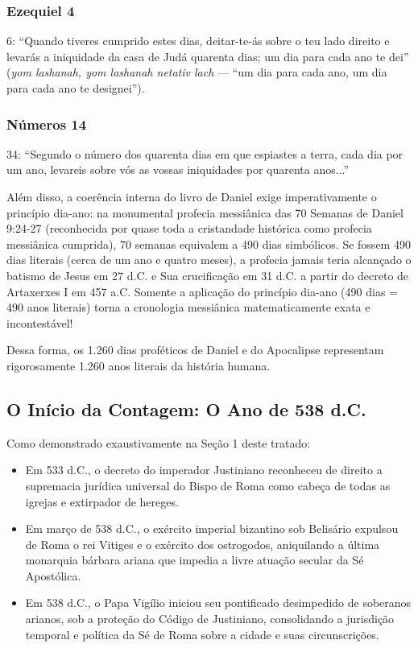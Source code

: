 \documentclass[11pt,a4paper,openany]{book}
\begin{document}
\subsubsection*{Ezequiel 4}
6: ``Quando tiveres cumprido estes dias, deitar-te-ás sobre o teu lado direito e levarás a iniquidade da casa de Judá quarenta dias; um dia para cada ano te dei'' (\textit{yom lashanah, yom lashanah netativ lach} — ``um dia para cada ano, um dia para cada ano te designei'').

\subsubsection*{Números 14}
34: ``Segundo o número dos quarenta dias em que espiastes a terra, cada dia por um ano, levareis sobre vós as vossas iniquidades por quarenta anos...''

Além disso, a coerência interna do livro de Daniel exige imperativamente o princípio dia-ano: na monumental profecia messiânica das 70 Semanas de Daniel 9:24-27 (reconhecida por quase toda a cristandade histórica como profecia messiânica cumprida), 70 semanas equivalem a 490 dias simbólicos. Se fossem 490 dias literais (cerca de um ano e quatro meses), a profecia jamais teria alcançado o batismo de Jesus em 27 d.C. e Sua crucificação em 31 d.C. a partir do decreto de Artaxerxes I em 457 a.C. Somente a aplicação do princípio dia-ano (490 dias = 490 anos literais) torna a cronologia messiânica matematicamente exata e incontestável!

Dessa forma, os 1.260 dias proféticos de Daniel e do Apocalipse representam rigorosamente 1.260 anos literais da história humana.



\subsection{O Início da Contagem: O Ano de 538 d.C.}


Como demonstrado exaustivamente na Seção 1 deste tratado:
\begin{itemize}
  \item Em 533 d.C., o decreto do imperador Justiniano reconheceu de direito a supremacia jurídica universal do Bispo de Roma como cabeça de todas as igrejas e extirpador de hereges.
  \item Em março de 538 d.C., o exército imperial bizantino sob Belisário expulsou de Roma o rei Vitiges e o exército dos ostrogodos, aniquilando a última monarquia bárbara ariana que impedia a livre atuação secular da Sé Apostólica.
  \item Em 538 d.C., o Papa Vigílio iniciou seu pontificado desimpedido de soberanos arianos, sob a proteção do Código de Justiniano, consolidando a jurisdição temporal e política da Sé de Roma sobre a cidade e suas circunscrições.
\end{itemize}
\end{document}

